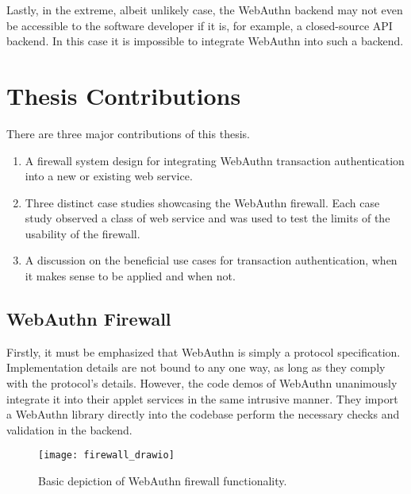 Lastly, in the extreme, albeit unlikely case, the WebAuthn backend may not even be accessible to the software developer if it is, for example, a closed-source API backend. In this case it is impossible to integrate WebAuthn into such a backend.

\section{Thesis Contributions}

There are three major contributions of this thesis. 

\begin{enumerate}[nosep]

\item A firewall system design for integrating WebAuthn transaction authentication into a new or existing web service.

\item Three distinct case studies showcasing the WebAuthn firewall. Each case study observed a class of web service and was used to test the limits of the usability of the firewall.

\item A discussion on the beneficial use cases for transaction authentication, when it makes sense to be applied and when not.

\end{enumerate}


\subsection{WebAuthn Firewall}

Firstly, it must be emphasized that WebAuthn is simply a protocol specification. Implementation details are not bound to any one way, as long as they comply with the protocol's details. However, the code demos of WebAuthn unanimously integrate it into their applet services in the same intrusive manner. They import a WebAuthn library \cite{webauthn-library} directly into the codebase perform the necessary checks and validation in the backend.

\begin{figure}[h]
  \centering
  \texttt{[image: firewall\_drawio]}
  \caption{Basic depiction of WebAuthn firewall functionality.}
\end{figure}

